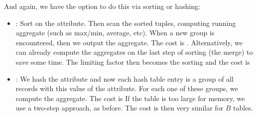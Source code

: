And again, we have the option to do this via sorting or hashing:
\begin{itemize}
    \item {}: Sort on the attribute. Then scan the sorted tuples, computing running aggregate (such as max/min, average, etc).
          When a new group is encountered, then we output the aggregate. The cost is .
          Alternatively, we can already compute the aggregates on the last step of sorting (the merge) to save some time.
          The limiting factor then becomes the sorting and the cost is 
    \item {}: We hash the attribute and now each hash table entry is a group of all records with this value of the attribute.
          For each one of these groups, we compute the aggregate. The cost is 
          If the table is too large for memory, we use a two-step approach, as before. The cost is then very similar  for $B$ tables.
\end{itemize}
